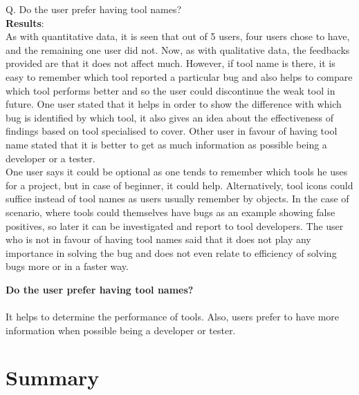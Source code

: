 Q. Do the user prefer having tool names? \\

\textbf{Results}: \\

As with quantitative data, it is seen that out of 5 users, four users chose to have, and the remaining one user did not. Now, as with qualitative data, the feedbacks provided are that it does not affect much. However, if tool name is there, it is easy to remember which tool reported a particular bug and also helps to compare which tool performs better and so the user could discontinue the weak tool in future. One user stated that it helps in order to show the difference with which bug is identified by which tool, it also gives an idea about the effectiveness of findings based on tool specialised to cover. Other user in favour of having tool name stated that it is better to get as much information as possible being a developer or a tester. \\

One user says it could be optional as one tends to remember which tools he uses for a project, but in case of beginner, it could help. Alternatively, tool icons could suffice instead of tool names as users usually remember by objects. In the case of scenario, where tools could themselves have bugs as an example showing false positives, so later it can be investigated and report to tool developers. The user who is not in favour of having tool names said that it does not play any importance in solving the bug and does not even relate to efficiency of solving bugs more or in a faster way. \\ 


\begin{myboxi}{{\textbf{Do the user prefer having tool names?}}}
	\\ \\ It helps to determine the performance of tools. Also, users prefer to have more information when possible being a developer or tester. \\
\end{myboxi}

\section{Summary}

